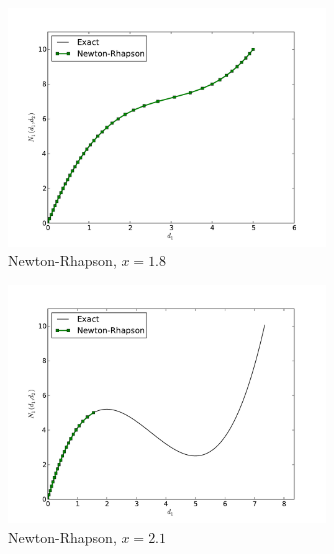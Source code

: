 \documentclass[12pt]{article}
\begin{document}
\clearpage
\begin{figure}[h!]
\centering
\includegraphics[width=0.75\textwidth]{NR18.pdf}
\caption{Newton-Rhapson, $x=1.8$}
\end{figure}
\begin{figure}[h!]
\centering
\includegraphics[width=0.75\textwidth]{NR21.pdf}
\caption{Newton-Rhapson, $x=2.1$}
\end{figure}
\end{document}

